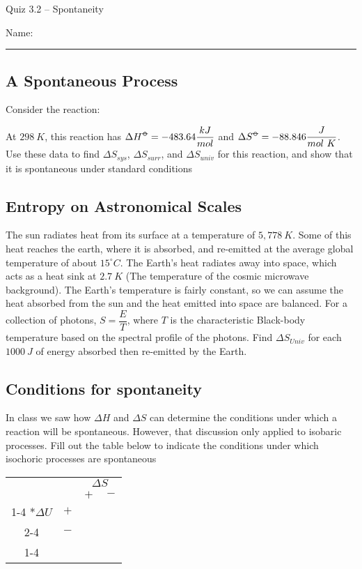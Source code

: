 \documentclass[11pt, letterpaper]{memoir}
\begin{document}
	\begin{center}
		{\large Quiz 3.2 -- Spontaneity}
	\end{center}
	{\large Name: \rule[-1mm]{4in}{.1pt} 

\subsection*{A Spontaneous Process}

Consider the reaction: 

\noindent
At $298~K$, this reaction has $\Delta H^{\std} = -483.64\dfrac{kJ}{mol}$ and $\Delta S^{\std}= -88.846\dfrac{J}{mol~K}$. Use these data to find $\Delta S_{sys}$, $\Delta S_{surr}$, and $\Delta S_{univ}$ for this reaction, and show that it is spontaneous under standard conditions

\vspace{4em}
\subsection*{Entropy on Astronomical Scales}
The sun radiates heat from its surface at a temperature of $5,778~K$. Some of this heat reaches the earth, where it is absorbed, and re-emitted at the average global temperature of about $15 ^\circ C$. The Earth's heat radiates away into space, which acts as a heat sink at $2.7~K$ (The temperature of the cosmic microwave background). The Earth's temperature is fairly constant, so we can assume the heat absorbed from the sun and the heat emitted into space are balanced. For a collection of photons, $S=\dfrac{E}{T}$, where $T$ is the characteristic Black-body temperature based on the spectral profile of the photons. Find $\Delta S_{Univ}$ for each $1000~J$ of energy absorbed then re-emitted by the Earth.


\vspace{10em}
\subsection*{Conditions for spontaneity}
In class we saw how $\Delta H$ and $\Delta S$ can determine the conditions under which a reaction will be spontaneous. However, that discussion only applied to isobaric processes. Fill out the table below to indicate the conditions under which isochoric processes are spontaneous

\begin{center}
	\begin{tabular}{cc|c|c|}
		&&\multicolumn{2}{c|}{$\Delta S$} \\
		&& $+$ & $-$ \\ \cline{1-4}
		\multirow{2}*{$\Delta U$} &$+$&~\hspace{12em}~& ~\hspace{12em}~\\  \cline{2-4}
		&$-$&& \\ \cline{1-4}
		

\end{tabular}
\end{center}}
\end{document}
